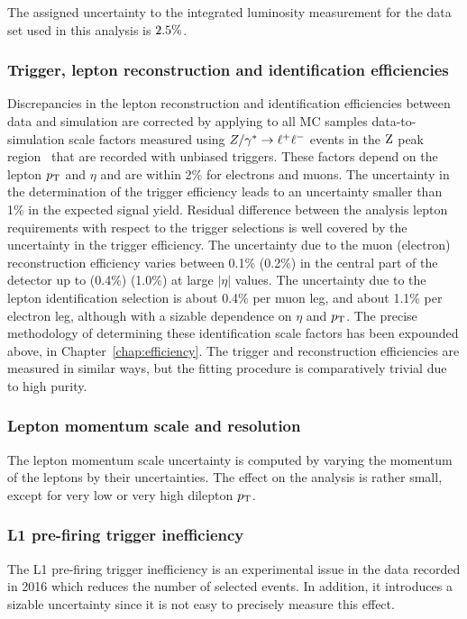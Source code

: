 The assigned uncertainty to the integrated luminosity measurement for
the data set used in this analysis is $2.5\%$.

\subsubsection{Trigger, lepton reconstruction and identification efficiencies}

Discrepancies in the lepton reconstruction and identification
efficiencies between data and simulation are corrected by applying
to all MC samples 
data-to-simulation scale factors measured using $Z/\gamma^*\to\ell^+\ell^-$ events in the $\mathrm{Z}$
peak region~\cite{wzxs} that are recorded with unbiased triggers. These factors
depend on the lepton $p_{\mathrm{T}}$ and $\eta$ and are within 2\% for electrons and muons.
The uncertainty in the determination of the trigger efficiency leads to an uncertainty 
smaller than 1\% in the expected signal yield. Residual difference between the analysis 
lepton requirements with respect to the trigger selections is well covered by 
the uncertainty in the trigger efficiency. The uncertainty due to 
the muon (electron) reconstruction efficiency varies between 0.1\% (0.2\%) in the central 
part of the detector up to (0.4\%) (1.0\%) at large $|\eta|$ values. 
The uncertainty due to the lepton identification selection is about 0.4\% per muon leg, and 
about 1.1\% per electron leg, although with a sizable dependence on $\eta$ and $p_{\mathrm{T}}$.
The precise methodology of determining these identification scale factors has been expounded above,
in Chapter~\ref{chap:efficiency}.
The trigger and reconstruction efficiencies are measured in similar ways,
but the fitting procedure is comparatively trivial due to high purity.

\subsubsection{Lepton momentum scale and resolution}

The lepton momentum scale uncertainty is computed by varying the
momentum of the leptons by their uncertainties. The effect 
on the analysis is rather small, except for very low or very high dilepton 
$p_{\mathrm{T}}$.

\subsubsection{L1 pre-firing trigger inefficiency}
The L1 pre-firing trigger inefficiency is an experimental issue in the data recorded in 2016
which reduces the number of selected events.
In addition, it introduces  a sizable uncertainty
since it is not easy to precisely measure this effect.


